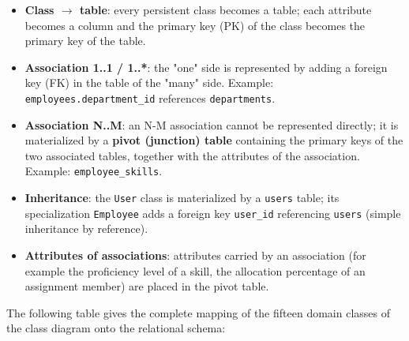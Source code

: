 \documentclass{bts-report}
\begin{document}
\begin{itemize}
  \item \textbf{Class $\rightarrow$ table}: every persistent class becomes a table; each attribute becomes a column and the primary key (PK) of the class becomes the primary key of the table.
  \item \textbf{Association 1..1 / 1..*}: the "one" side is represented by adding a foreign key (FK) in the table of the "many" side. Example: \texttt{employees.department\_id} references \texttt{departments}.
  \item \textbf{Association N..M}: an N-M association cannot be represented directly; it is materialized by a \textbf{pivot (junction) table} containing the primary keys of the two associated tables, together with the attributes of the association. Example: \texttt{employee\_skills}.
  \item \textbf{Inheritance}: the \texttt{User} class is materialized by a \texttt{users} table; its specialization \texttt{Employee} adds a foreign key \texttt{user\_id} referencing \texttt{users} (simple inheritance by reference).
  \item \textbf{Attributes of associations}: attributes carried by an association (for example the proficiency level of a skill, the allocation percentage of an assignment member) are placed in the pivot table.
\end{itemize}

The following table gives the complete mapping of the fifteen domain classes of the class diagram onto the relational schema:
\end{document}
